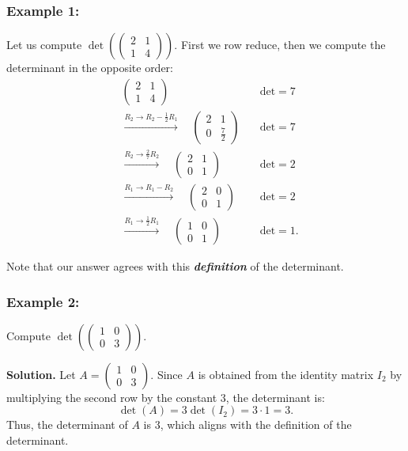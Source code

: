 \documentclass[a4paper,12pt]{article}
\begin{document}
\subsubsection*{Example 1:}
\noindent Let us compute \(\det\left(\begin{pmatrix} 2 & 1 \\ 1 & 4 \end{pmatrix}\right)\). First we row reduce, then we compute the determinant in the opposite order:
\[
\begin{aligned}
&\begin{pmatrix} 2 & 1 \\ 1 & 4 \end{pmatrix} \quad &\text{det} = 7 \\[1em]
&\xrightarrow{R_2 \to R_2 - \frac{1}{2}R_1} \quad \begin{pmatrix} 2 & 1 \\ 0 & \frac{7}{2} \end{pmatrix} \quad &\text{det} = 7 \\[1em]
&\xrightarrow{R_2 \to \frac{2}{7}R_2} \quad \begin{pmatrix} 2 & 1 \\ 0 & 1 \end{pmatrix} \quad &\text{det} = 2 \\[1em]
&\xrightarrow{R_1 \to R_1 - R_2} \quad \begin{pmatrix} 2 & 0 \\ 0 & 1 \end{pmatrix} \quad &\text{det} = 2 \\[1em]
&\xrightarrow{R_1 \to \frac{1}{2}R_1} \quad \begin{pmatrix} 1 & 0 \\ 0 & 1 \end{pmatrix} \quad &\text{det} = 1.
\end{aligned}
\]


\noindent Note that our answer agrees with this \textbf{\textit{definition}} of the determinant.

\subsubsection*{Example 2:}
\noindent Compute \(\det\left(\begin{pmatrix} 1 & 0 \\ 0 & 3 \end{pmatrix}\right)\).

\textbf{Solution.} Let \(A = \begin{pmatrix} 1 & 0 \\ 0 & 3 \end{pmatrix}\). Since \(A\) is obtained from the identity matrix \(I_2\) by multiplying the second row by the constant \(3\), the determinant is:
\[
\det(A) = 3 \det(I_2) = 3 \cdot 1 = 3.
\]
Thus, the determinant of \(A\) is \(3\), which aligns with the definition of the determinant.
\end{document}
